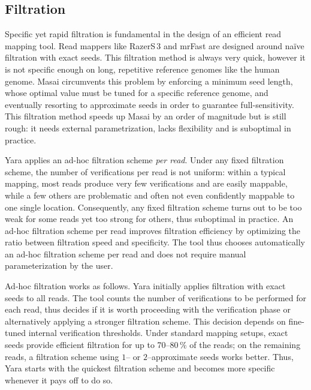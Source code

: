 \subsection{Filtration}

Specific yet rapid filtration is fundamental in the design of an efficient read mapping tool.
Read mappers like RazerS\,3 \citep{RazerS3} and mrFast \citep{Ahmadi2011} are designed around na\"ive filtration with exact seeds.
This filtration method is always very quick, however it is not specific enough on long, repetitive reference genomes like the human genome.
Masai \citep{Siragusa2013} circumvents this problem by enforcing a minimum seed length,
whose optimal value must be tuned for a specific reference genome, and eventually resorting to approximate seeds in order to guarantee full-sensitivity.
This filtration method speeds up Masai by an order of magnitude but is still rough:
it needs external parametrization, lacks flexibility and is suboptimal in practice.

Yara applies an ad-hoc filtration scheme \emph{per read}.
Under any fixed filtration scheme, the number of verifications per read is not uniform: within a typical mapping, most reads produce very few verifications and are easily mappable, while a few others are problematic and often not even confidently mappable to one single location.
Consequently, any fixed filtration scheme turns out to be too weak for some reads yet too strong for others, thus suboptimal in practice.
An ad-hoc filtration scheme per read improves filtration efficiency by optimizing the ratio between filtration speed and specificity.
The tool thus chooses automatically an ad-hoc filtration scheme per read and does not require manual parameterization by the user.

Ad-hoc filtration works as follows.
Yara initially applies filtration with exact seeds to all reads.
The tool counts the number of verifications to be performed for each read, thus decides if it is worth proceeding with the verification phase or alternatively applying a stronger filtration scheme.
This decision depends on fine-tuned internal verification thresholds.
Under standard mapping setups, exact seeds provide efficient filtration for up to 70--80\,\% of the reads; on the remaining reads, a filtration scheme using $1$-- or $2$--approximate seeds works better.
Thus, Yara starts with the quickest filtration scheme and becomes more specific whenever it pays off to do so.


